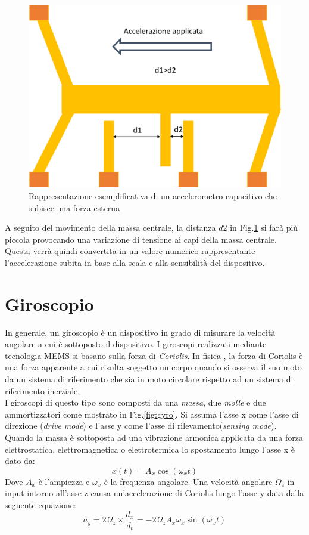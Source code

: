  \begin{figure}[H]  
	\centering 
	\includegraphics[scale=0.25 ]{tecnologie/acc2.png}
	\caption{Rappresentazione esemplificativa di un accelerometro capacitivo che subisce una forza esterna}
	\label{fig:acc2}
\end{figure}

A seguito del movimento della massa centrale, la distanza $d2$ in Fig.\ref{fig:acc2} si farà più piccola provocando una variazione di tensione ai capi della massa centrale. Questa verrà quindi convertita in un valore numerico rappresentante l'accelerazione subita in base alla scala e alla sensibilità del dispositivo.\\ 

\section{Giroscopio}
\label{giroscopi}
In generale, un giroscopio è un dispositivo in grado di misurare la velocità angolare a cui è sottoposto il dispositivo. I giroscopi realizzati mediante tecnologia MEMS si basano sulla forza di \textit{Coriolis}. In fisica \cite{corolois}, la forza di Coriolis è una forza apparente a cui risulta soggetto un corpo quando si osserva il suo moto da un sistema di riferimento che sia in moto circolare rispetto ad un sistema di riferimento inerziale. \\
I giroscopi di questo tipo sono composti \cite{gyroMems} da una \textit{massa}, due \textit{molle} e due ammortizzatori come mostrato in Fig.\ref{fig:gyro}. Si assuma  l'asse x come l'asse di direzione (\textit{drive mode}) e l'asse y come l'asse di rilevamento(\textit{sensing mode}). Quando la massa è sottoposta ad una vibrazione armonica applicata da una forza elettrostatica, elettromagnetica o elettrotermica lo spostamento lungo l'asse x è dato da:
\begin{equation}
x(t) = A_x \cos(\omega_x t)
\end{equation}
Dove $A_x$ è l'ampiezza e $\omega_x$ è la frequenza angolare.  Una velocità angolare $\Omega_z$ in input intorno all'asse z causa un'accelerazione di Coriolis lungo l'asse y data dalla seguente equazione:
\begin{equation}
a_y= 2\Omega_z \times \frac{d_x}{d_t}= -2\Omega_z A_x \omega_x \sin(\omega_x t)
\end{equation}

